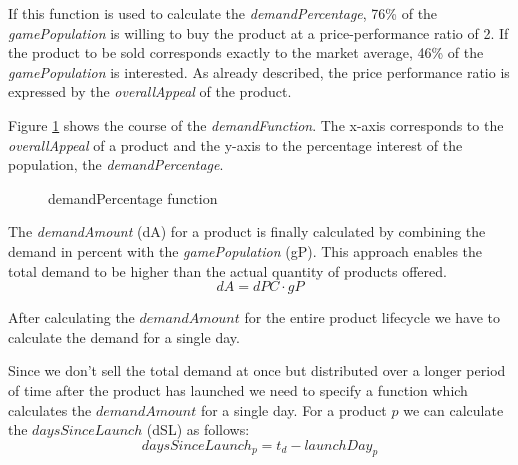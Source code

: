 If this function is used to calculate the \textit{demandPercentage}, 76\% of the \textit{gamePopulation} is willing to buy the product at a price-performance ratio of 2. If the product to be sold corresponds exactly to the market average, 46\% of the \textit{gamePopulation} is interested. As already described, the price performance ratio is expressed by the \textit{overallAppeal} of the product.

Figure \ref{demand_function} shows the course of the \textit{demandFunction}. The x-axis corresponds to the \textit{overallAppeal} of a product and the y-axis to the percentage interest of the population, the \textit{demandPercentage}. 

\begin{figure}[h]
\centering
{}
	\caption{demandPercentage function}
	\label{demand_function}
\end{figure}

The \textit{demandAmount} (\gls{dA}) for a product is finally calculated by combining the demand in percent with the \textit{gamePopulation} (\gls{gP}). This approach enables the total demand to be higher than the actual quantity of products offered.
\begin{equation}
\label{func:demandAmount}
dA = dPC \cdot gP    
\end{equation}

After calculating the $demandAmount$ for the entire product lifecycle we have to calculate the demand for a single day.

Since we don't sell the total demand at once but distributed over a longer period of time after the product has launched we need to specify a function which calculates the $demandAmount$ for a single day. For a product $p$ we can calculate the $daysSinceLaunch$ (\gls{dSL}) as follows:
\begin{equation}
	daysSinceLaunch_p = t_d -launchDay_{p}
\end{equation}

